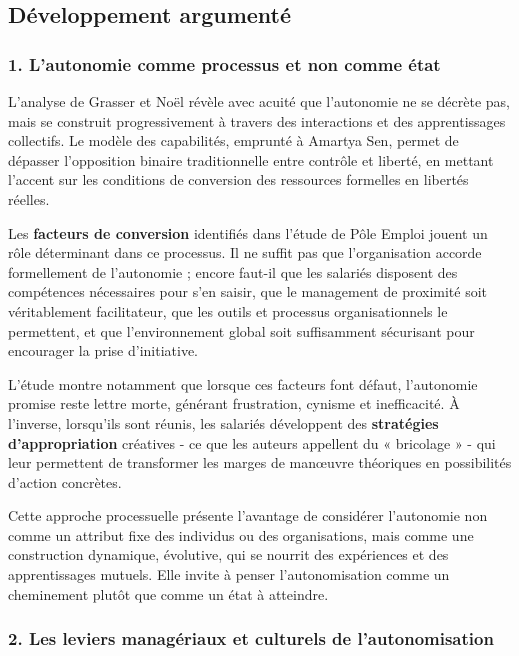 \documentclass{rapportECL}
\begin{document}
\subsection*{Développement argumenté}

\subsubsection*{1. L'autonomie comme processus et non comme état}

L'analyse de Grasser et Noël révèle avec acuité que l'autonomie ne se décrète pas, mais se construit progressivement à travers des interactions et des apprentissages collectifs. Le modèle des capabilités, emprunté à Amartya Sen, permet de dépasser l'opposition binaire traditionnelle entre contrôle et liberté, en mettant l'accent sur les conditions de conversion des ressources formelles en libertés réelles.

Les \textbf{facteurs de conversion} identifiés dans l'étude de Pôle Emploi jouent un rôle déterminant dans ce processus. Il ne suffit pas que l'organisation accorde formellement de l'autonomie ; encore faut-il que les salariés disposent des compétences nécessaires pour s'en saisir, que le management de proximité soit véritablement facilitateur, que les outils et processus organisationnels le permettent, et que l'environnement global soit suffisamment sécurisant pour encourager la prise d'initiative.

\newpage

L'étude montre notamment que lorsque ces facteurs font défaut, l'autonomie promise reste lettre morte, générant frustration, cynisme et inefficacité. À l'inverse, lorsqu'ils sont réunis, les salariés développent des \textbf{stratégies d'appropriation} créatives - ce que les auteurs appellent du « bricolage » - qui leur permettent de transformer les marges de manœuvre théoriques en possibilités d'action concrètes.

Cette approche processuelle présente l'avantage de considérer l'autonomie non comme un attribut fixe des individus ou des organisations, mais comme une construction dynamique, évolutive, qui se nourrit des expériences et des apprentissages mutuels. Elle invite à penser l'autonomisation comme un cheminement plutôt que comme un état à atteindre.

\subsubsection*{2. Les leviers managériaux et culturels de l'autonomisation}
\end{document}
